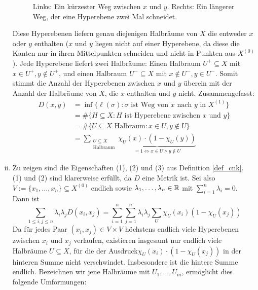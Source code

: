 \begin{enumerate}[(i)]
\begin{figure}[h]
			\caption*{Links: Ein kürzester Weg zwischen $x$ und $y$. Rechts: Ein längerer Weg, der eine Hyperebene zwei Mal schneidet.}
		\end{figure}
		Diese Hyperebenen liefern genau diejenigen Halbräume von $X$ die entweder $x$ oder $y$ enthalten ($x$ und $y$ liegen nicht auf einer Hyperebene, da diese die Kanten nur in ihren Mittelpunkten schneiden und nicht in Punkten aus $X^{(0)}$). Jede Hyperebene liefert zwei Halbräume: Einen Halbraum $U^+ \subseteq X$ mit $x \in U^+, y \notin U^+$, und einen Halbraum $U^- \subseteq X$ mit $x \notin U^-, y \in U^-$.
		\newpage
		Somit stimmt die Anzahl der Hyperebenen zwischen $x$ und $y$ überein mit der Anzahl der Halbräume von $X$, die $x$ enthalten und $y$ nicht. Zusammengefasst:
		\begin{equation}
		\begin{aligned}
			D(x,y) &= \inf \{ \ell(\sigma) : \sigma \text{ ist Weg von } x \text{ nach } y \text{ in } X^{(1)}\} \\
			&= \#\{H \subseteq X : H \text{ ist Hyperebene zwischen } x \text{ und } y\} \\
			&= \#\{U \subseteq X \text{ Halbraum} : x \in U, y \notin U \} \\
			&= \sum_{\substack{U \subseteq X \\ \text{Halbraum}}} \underbrace{\chi_U(x) \cdot (1- \chi_U(y))}_{= 1 \Leftrightarrow x \in U \wedge y \notin U}
		\end{aligned}
		\end{equation}
		\item Zu zeigen sind die Eigenschaften (1), (2) und (3) aus Definition \ref{def_cnk}. \\
		(1) und (2) sind klarerweise erfüllt, da $D$ eine Metrik ist. Sei also $V:= \{x_1, \dots, x_n\} \subseteq X^{(0)}$ endlich sowie $\lambda_1, \dots, \lambda_n \in \mathbb{R}$ mit $\sum_{i=1}^{n} \lambda_i = 0$. Dann ist
		\[ \sum\limits_{1 \leq i,j \leq n} \lambda_i \lambda_j D(x_i,x_j) = \sum\limits_{i=1}^{n} \sum\limits_{j=1}^{n} \lambda_i \lambda_j \sum\limits_{U} \chi_U (x_i) (1-\chi_U (x_j))\]
		Da für jedes Paar $(x_i,x_j) \in V \times V$ höchstens endlich viele Hyperebenen zwischen $x_i$ und $x_j$ verlaufen, existieren insgesamt nur endlich viele Halbräume $U \subseteq X$, für die der Ausdruck\linebreak $\chi_U(x_i) \cdot (1-\chi_U(x_j))$ in der hinteren Summe nicht verschwindet. Insbesondere ist die hintere Summe endlich. Bezeichnen wir jene Halbräume mit $U_1, \dots, U_m$, ermöglicht dies folgende Umformungen:

\end{enumerate}
